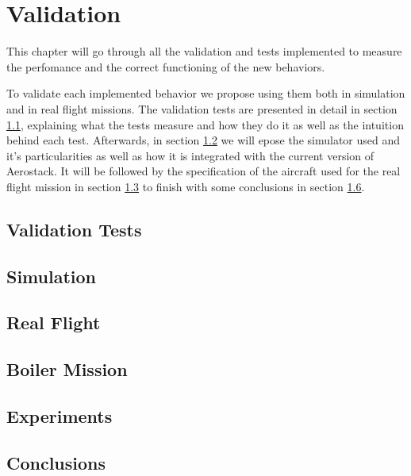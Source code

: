 \chapter{Validation}

  This chapter will go through all the validation and tests implemented to measure the perfomance and the correct functioning of the new behaviors. 

  To validate each implemented behavior we propose using them both in simulation and in real flight missions. The validation tests are presented in detail in section \ref{ch_5:sect:val_tests}, explaining what the tests measure and how they do it as well as the intuition behind each test. Afterwards, in section \ref{ch_5:sect:simulation} we will epose the simulator used and it's particularities as well as how it is integrated with the current version of Aerostack. It will be followed by the specification of the aircraft used for the real flight mission in section \ref{ch_5:sect:real_flight} to finish with some conclusions in section \ref{ch_5:sect:conclusions}.

\section{Validation Tests} \label{ch_5:sect:val_tests}

\section{Simulation} \label{ch_5:sect:simulation}

\section{Real Flight} \label{ch_5:sect:real_flight}

\section{Boiler Mission} \label{ch_5:sect:boiler_mission}

\section{Experiments} \label{ch_5:sect:experiments}

\section{Conclusions} \label{ch_5:sect:conclusions}

\begin{comment}
  \begin{itemize}
    \item Comment bullet
  \end{itemize}
\end{comment}
